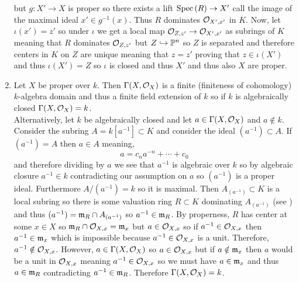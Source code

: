 \documentclass[12pt]{article}
\begin{document}
\begin{enumerate}
\begin{center}
\end{center}
but $g : X' \to X$ is proper so there exists a lift $\mathrm{Spec}\left( R \right) \to X'$ call the image of the maximal ideal $x' \in g^{-1}(x)$. Thus $R$ dominates $\mathcal{O}_{X', x'}$ in $K$. Now, let $\iota(x') = z'$ so under $\iota$ we get a local map $\mathcal{O}_{Z, z'} \to \mathcal{O}_{X', x'}$ as subrings of $K$ meaning that $R$ dominates $\mathcal{O}_{Z, z'}$ but $Z \hookrightarrow \mathbb{P}^n$ so $Z$ is separated and therefore centers in $K$ on $Z$ are unique meaning that $z = z'$ proving that $z \in \iota(X')$ and thus $\iota(X') = Z$ so $\iota$ is closed and thus $X'$ and thus also $X$ are proper.

\item Let $X$ be proper over $k$. Then $\Gamma(X, \mathcal{O}_{X})$ is a finite (finiteness of cohomology) $k$-algebra domain and thus a finite field extension of $k$ so if $k$ is algebraically closed $\Gamma(X, \mathcal{O}_{X}) = k$.
\bigskip\\
Alternatively, let $k$ be algebraically closed and let $a \in \Gamma(X, \mathcal{O}_{X})$ and $a \notin k$. Consider the subring $A = k[a^{-1}] \subset K$ and consider the ideal $(a^{-1}) \subset A$. If $(a^{-1}) = A$ then $a \in A$ meaning,
\[ a = c_n a^{-n} + \cdots + c_0 \]
and therefore dividing by $a$ we see that $a^{-1}$ is algebraic over $k$ so by algebraic closure $a^{-1} \in k$ contradicting our assumption on $a$ so $(a^{-1})$ is a proper ideal. Furthermore $A / (a^{-1}) = k$ so it is maximal. Then $A_{(a^{-1})} \subset K$ is a local subring so there is some valuation ring $R \subset K$ dominating $A_{(a^{-1})}$ (see ) and thus $(a^{-1}) = \mathfrak{m}_R \cap A_{(a^{-1})}$ so $a^{-1} \in \mathfrak{m}_R$. By properness, $R$ has center at some $x \in X$ so $\mathfrak{m}_R \cap \mathcal{O}_{X, x} = \mathfrak{m}_x$ but $a \in \mathcal{O}_{X, x}$ so if $a^{-1} \in \mathcal{O}_{X, x}$ then $a^{-1} \in \mathfrak{m}_x$ which is impossible because $a^{-1} \in \mathcal{O}_{X, x}$ is a unit. Therefore, $a^{-1} \notin \mathcal{O}_{X, x}$. However, $a \in \Gamma(X, \mathcal{O}_{X})$ so $a \in \mathcal{O}_{X, x}$ but if $a \notin \mathfrak{m}_x$ then $a$ would be a unit in $\mathcal{O}_{X, x}$ meaning $a^{-1} \in \mathcal{O}_{X, x}$ so we must have $a \in \mathfrak{m}_x$ and thus $a \in \mathfrak{m}_R$ contradicting $a^{-1} \in \mathfrak{m}_R$. Therefore $\Gamma(X, \mathcal{O}_{X}) = k$.
\end{enumerate}
\end{document}

